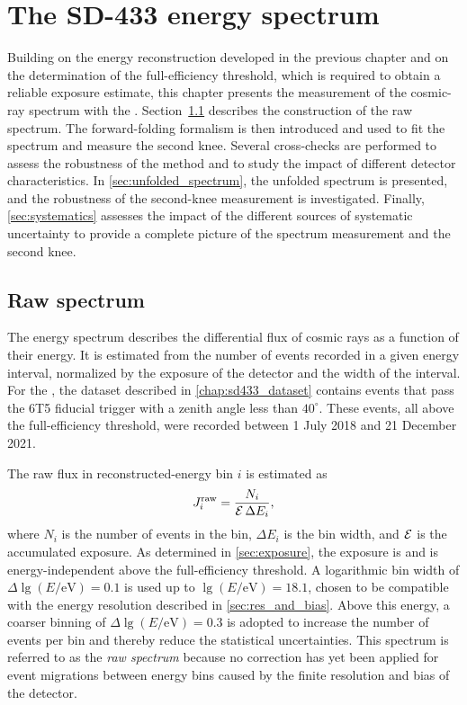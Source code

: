 \documentclass[main.tex]{subfiles}
\begin{document}
\chapter{The SD-433 energy spectrum}
\label{chapter:SD433_Spectrum}
\label{chap:sdpectrum}

Building on the energy reconstruction developed in the previous chapter and on the determination of the full-efficiency threshold, which is required to obtain a reliable exposure estimate, this chapter presents the measurement of the cosmic-ray spectrum with the .
Section~\cref{sec:raw_spectrum} describes the construction of the raw spectrum.
The forward-folding formalism is then introduced and used to fit the spectrum and measure the second knee.
Several cross-checks are performed to assess the robustness of the method and to study the impact of different detector characteristics.
In \cref{sec:unfolded_spectrum}, the unfolded spectrum is presented, and the robustness of the second-knee measurement is investigated.
Finally, \cref{sec:systematics} assesses the impact of the different sources of systematic uncertainty to provide a complete picture of the spectrum measurement and the second knee.

\section{Raw spectrum}
\label{sec:raw_spectrum}
The energy spectrum describes the differential flux of cosmic rays as a function of their energy.
It is estimated from the number of events recorded in a given energy interval, normalized by the exposure of the detector and the width of the interval.
For the , the dataset described in \cref{chap:sd433_dataset} contains \SDFourThreeThreeNEvents events that pass the 6T5 fiducial trigger with a zenith angle less than $40^\circ$.
These events, all above the full-efficiency threshold, were recorded between 1 July 2018 and 21 December 2021.

The raw flux in reconstructed-energy bin $i$ is estimated as
\begin{align}
    J_i^{\mathrm{raw}}
    =
    \frac{N_i}{\mathcal{E}\,\Delta E_i},
    \label{eq:raw_flux}
\end{align}
where $N_i$ is the number of events in the bin, $\Delta E_i$ is the bin width, and $\mathcal{E}$ is the accumulated exposure.
As determined in \cref{sec:exposure}, the exposure is \SDFourThreeThreeExposure{} and is energy-independent above the full-efficiency threshold.
A logarithmic bin width of $\Delta\lg(E/\mathrm{eV})=0.1$ is used up to $\lg(E/\mathrm{eV})=18.1$, chosen to be compatible with the energy resolution described in \cref{sec:res_and_bias}.
Above this energy, a coarser binning of $\Delta\lg(E/\mathrm{eV})=0.3$ is adopted to increase the number of events per bin and thereby reduce the statistical uncertainties.
This spectrum is referred to as the \textit{raw spectrum} because no correction has yet been applied for event migrations between energy bins caused by the finite resolution and bias of the detector.
\end{document}
